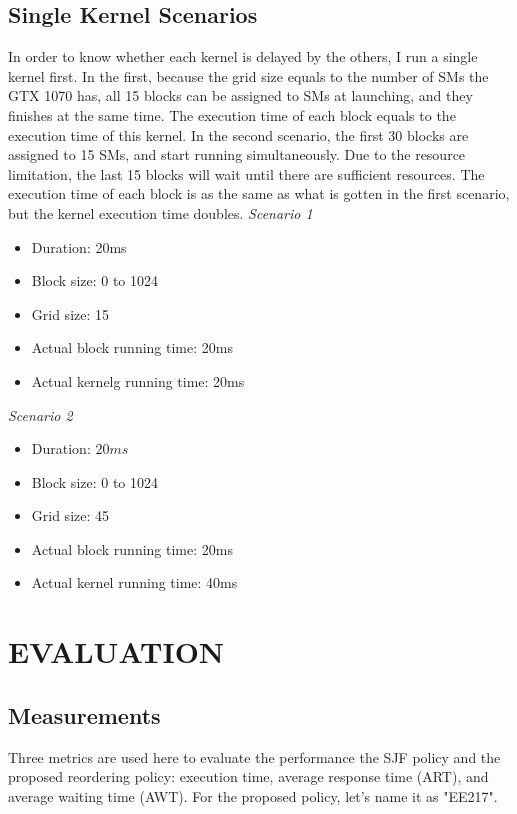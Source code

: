 \documentclass[conference]{IEEEtran}
\begin{document}
\subsection{Single Kernel Scenarios}
In order to know whether each kernel is delayed by the others, I run a single kernel first. In the first, because the grid size equals to the number of SMs the GTX 1070 has, all 15 blocks can be assigned to SMs at launching, and they finishes at the same time. The execution time of each block equals to the execution time of this kernel. In the second scenario, the first 30 blocks are assigned to 15 SMs, and start running simultaneously. Due to the resource limitation, the last 15 blocks will wait until there are sufficient resources. The execution time of each block is as the same as what is gotten in the first scenario, but the kernel execution time doubles. \newline
\textit{Scenario 1}
\begin{itemize}
   \item Duration: 20ms
   \item Block size: 0 to 1024
   \item Grid size: 15
   \item Actual block running time: 20ms
   \item Actual kernelg running time: 20ms
\end{itemize}
\textit{Scenario 2}
\begin{itemize}
   \item Duration: $20ms$
   \item Block size: 0 to 1024
   \item Grid size: 45
   \item Actual block running time: 20ms
   \item Actual kernel running time: 40ms
\end{itemize}


\section{EVALUATION}
\subsection{Measurements}
Three metrics are used here to evaluate the performance the SJF policy and the proposed reordering policy: execution time, average response time (ART), and average waiting time (AWT). For the proposed policy, let's name it as "EE217".
\end{document}
